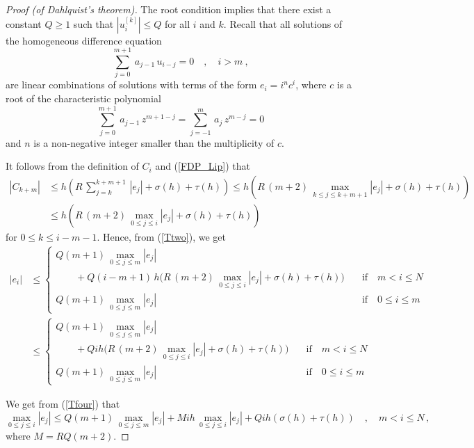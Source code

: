 \begin{proof}[Proof (of Dahlquist's theorem)]
The root condition implies that there exist a constant $Q \geq 1$ such
that $| u_i^{[k]} | \leq Q$ for all $i$ and $k$.  Recall that all
solutions of the homogeneous difference equation
\begin{equation} \label{Tthree}
\sum_{j=0}^{m+1}\,a_{j-1}\,u_{i-j} = 0 \quad , \quad i > m \ ,
\end{equation}
are linear combinations of solutions with terms of the
form $e_i = i^n c^i$, where $c$ is a root of the characteristic polynomial
\[
  \sum_{j=0}^{m+1}\, a_{j-1}\,z^{m+1-j} =
  \sum_{j=-1}^m\, a_j\,z^{m-j} = 0
\]
and $n$ is a non-negative integer smaller than the multiplicity of
$c$.

It follows from the definition of $C_i$ and (\ref{FDP_Lip}) that
\begin{align*}
|C_{k+m}| &\leq h\left(R\,\sum_{j=k}^{k+m+1}\,|e_j| +\sigma(h) + \tau(h)
\right)
\leq h\left(R\,(m+2)\,\max_{k\leq j \leq k+m+1} |e_j|
+ \sigma(h) + \tau(h) \right) \\
& \leq h\left(R\,(m+2)\,\max_{0\leq j \leq i} |e_j| +\sigma(h) + \tau(h)
\right)
\end{align*}
for  $0\leq k \leq i-m -1$.  Hence, from (\ref{Ttwo}), we get
\begin{align}
|e_i| & \leq
\begin{cases}
\displaystyle Q(m+1)\,\max_{0\leq j \leq m} |e_j| & \\
\displaystyle \qquad + Q(i-m+1)\,h \bigg( R\,(m+2)\,\max_{0\leq j \leq i} |e_j|
+ \sigma(h) + \tau(h) \bigg) & \quad \text{if}\quad  m< i \leq N\\[1em]
\displaystyle Q(m+1)\,\max_{0\leq j \leq m} |e_j| & \quad \text{if}
\quad 0\leq i \leq m
\end{cases}  \nonumber \\
& \leq
\begin{cases}
\displaystyle Q(m+1)\,\max_{0\leq j \leq m} |e_j| & \\
\displaystyle \qquad + Qih \bigg( R\,(m+2)\,\max_{0\leq j \leq i} |e_j|
+ \sigma(h) + \tau(h) \bigg) & \quad \text{if}\quad  m< i \leq N\\[1em]
\displaystyle Q(m+1)\,\max_{0\leq j \leq m} |e_j| & \quad \text{if}
\quad 0\leq i \leq m
\end{cases}  \label{Tfour}
\end{align}

We get from (\ref{Tfour}) that
\begin{equation}\label{Tsix}
\max_{0\leq j \leq i} |e_j| \leq
Q(m+1)\,\max_{0\leq j \leq m} |e_j|
+ M i h\,\max_{0\leq j \leq i} |e_j|
+ Q i h \left(\sigma(h) + \tau(h) \right) \quad , \quad m < i \leq N \, ,
\end{equation}
where $M= RQ(m+2)$.


\end{proof}
